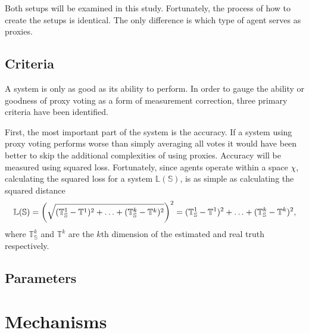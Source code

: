 Both setups will be examined in this study.
Fortunately, the process of how to create the setups is identical.
The only difference is which type of agent serves as proxies.

\subsection{Criteria}\label{subsec:criteria}
A system is only as good as its ability to perform.
In order to gauge the ability or goodness of proxy voting as a form of
measurement correction, three primary criteria have been identified.

First, the most important part of the system is the accuracy.
If a system using proxy voting performs worse than simply averaging all votes
it would have been better to skip the additional complexities of using
proxies.
Accuracy will be measured using squared loss.
Fortunately, since agents operate within a space $\chi$, calculating the
squared loss for a system $\mathbb{L}{(\mathbb{S})}$, is
as simple as calculating the squared distance
\begin{equation}
    \mathbb{L}{(\mathbb{S})} = {
        \left(\sqrt{
            (\mathbb{T}_\mathbb{S}^1 - \mathbb{T}^1)^2 +
            \mathellipsis +
            (\mathbb{T}_\mathbb{S}^k - \mathbb{T}^k)^2
        }\right)
    }^2 =
    (\mathbb{T}_\mathbb{S}^1 - \mathbb{T}^1)^2 +
    \mathellipsis +
    (\mathbb{T}_\mathbb{S}^k - \mathbb{T}^k)^2
    \text{,}\label{eq:loss}
\end{equation}
where $\mathbb{T}_\mathbb{S}^k$ and $\mathbb{T}^k$ are the $k$th dimension of
the estimated and real truth respectively.


\subsection{Parameters}\label{subsec:parameters}

\section{Mechanisms}\label{sec:mechanisms}

